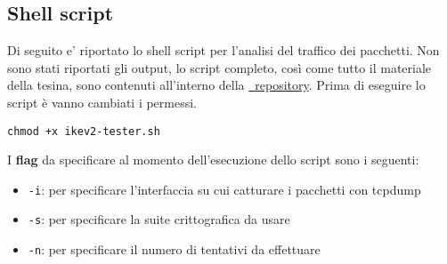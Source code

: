 \documentclass[
10pt, %
a4paper, %
oneside, %
headinclude,footinclude, %
BCOR5mm, %
]{scrartcl}
\begin{document}
\subsection*{Shell script}
\hypertarget{misurazioni}{}
Di seguito e' riportato lo shell script per l'analisi del traffico dei pacchetti.
Non sono stati riportati gli output, lo script completo, così come tutto il materiale della tesina, sono 
contenuti all'interno della \href{https://github.com/DavideDeZuane/IKE}{\faGithub \, repository}.
Prima di eseguire lo script è vanno cambiati i permessi.

\vspace*{0.2cm}
\begin{lstlisting}
chmod +x ikev2-tester.sh
\end{lstlisting}
\noindent
I \textbf{flag} da specificare al momento dell'esecuzione dello script sono i seguenti:
\begin{itemize}
    \item \lstinline|-i|: per specificare l'interfaccia su cui catturare i pacchetti con tcpdump
    \item \lstinline|-s|: per specificare la suite crittografica da usare
    \item \lstinline|-n|: per specificare il numero di tentativi da effettuare
\end{itemize}
\end{document}
